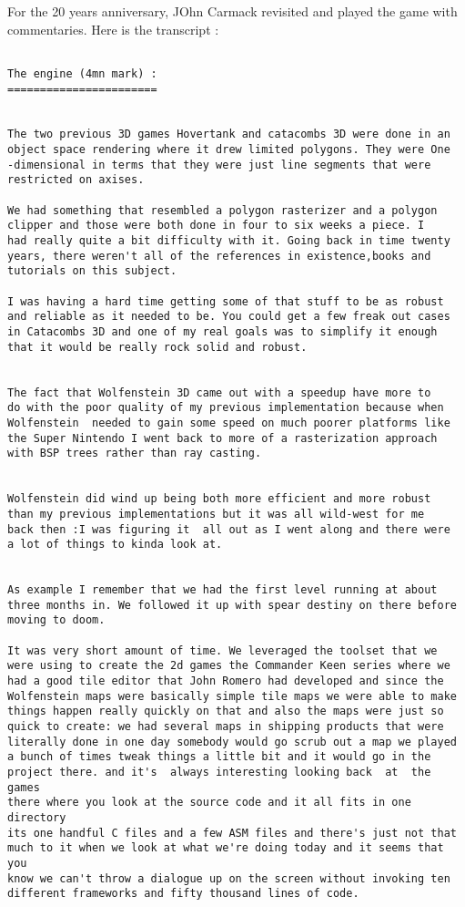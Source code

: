 \documentclass[book.tex]{subfiles}
\begin{document}
For the 20 years anniversary, JOhn Carmack revisited and played the game with commentaries. Here is the transcript :

\begin{breakable_box}
   \begin{verbatim}
   
The engine (4mn mark) :
=======================


The two previous 3D games Hovertank and catacombs 3D were done in an 
object space rendering where it drew limited polygons. They were One
-dimensional in terms that they were just line segments that were 
restricted on axises.

We had something that resembled a polygon rasterizer and a polygon 
clipper and those were both done in four to six weeks a piece. I 
had really quite a bit difficulty with it. Going back in time twenty
years, there weren't all of the references in existence,books and 
tutorials on this subject.

I was having a hard time getting some of that stuff to be as robust
and reliable as it needed to be. You could get a few freak out cases
in Catacombs 3D and one of my real goals was to simplify it enough
that it would be really rock solid and robust.


The fact that Wolfenstein 3D came out with a speedup have more to 
do with the poor quality of my previous implementation because when 
Wolfenstein  needed to gain some speed on much poorer platforms like
the Super Nintendo I went back to more of a rasterization approach 
with BSP trees rather than ray casting.


Wolfenstein did wind up being both more efficient and more robust 
than my previous implementations but it was all wild-west for me 
back then :I was figuring it  all out as I went along and there were
a lot of things to kinda look at.


As example I remember that we had the first level running at about
three months in. We followed it up with spear destiny on there before
moving to doom.

It was very short amount of time. We leveraged the toolset that we 
were using to create the 2d games the Commander Keen series where we 
had a good tile editor that John Romero had developed and since the 
Wolfenstein maps were basically simple tile maps we were able to make 
things happen really quickly on that and also the maps were just so 
quick to create: we had several maps in shipping products that were 
literally done in one day somebody would go scrub out a map we played 
a bunch of times tweak things a little bit and it would go in the 
project there. and it's  always interesting looking back  at  the games 
there where you look at the source code and it all fits in one directory 
its one handful C files and a few ASM files and there's just not that 
much to it when we look at what we're doing today and it seems that you 
know we can't throw a dialogue up on the screen without invoking ten 
different frameworks and fifty thousand lines of code.




\end{verbatim}
\end{breakable_box}
\end{document}
